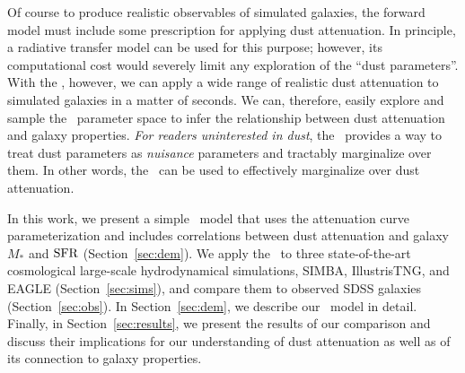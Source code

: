 Of course to produce realistic observables of simulated galaxies, the forward
model must include some prescription for applying dust attenuation. In
principle, a radiative transfer model can be used for this purpose; however,
its computational cost would severely limit any exploration of the ``dust
parameters''. With the \eda, however, we can apply a wide range of realistic
dust attenuation to simulated galaxies in a matter of seconds. We can,
therefore, easily explore and sample the \eda~parameter space to infer the 
relationship between dust attenuation and galaxy properties. {\em For readers 
uninterested in dust}, the \eda~provides a way to treat dust parameters as
{\em nuisance} parameters and tractably marginalize over them. In other words, 
the \eda~can be used to effectively marginalize over dust attenuation. 

In this work, we present a simple \eda~model that uses the \cite{noll2009}
attenuation curve parameterization and includes correlations between dust
attenuation and galaxy $M_*$ and ${\rm SFR}$ (Section~\ref{sec:dem}). We apply 
the \eda~to three state-of-the-art cosmological large-scale hydrodynamical 
simulations, SIMBA, IllustrisTNG, and EAGLE (Section~\ref{sec:sims}), and 
compare them to observed SDSS galaxies (Section~\ref{sec:obs}). In 
Section~\ref{sec:dem}, we describe our \eda~model in detail. Finally, in
Section~\ref{sec:results}, we present the results of our comparison and discuss 
their implications for our understanding of dust attenuation as well as of its
connection to galaxy properties. 
